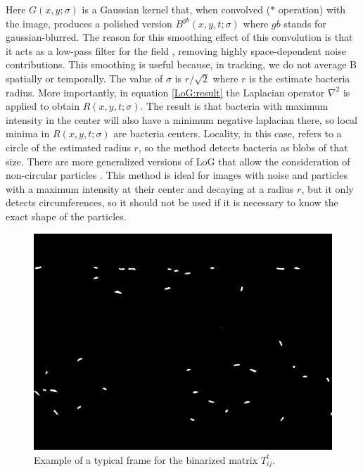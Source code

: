 Here $G(x,y;\sigma)$ is a Gaussian kernel that, when convolved ($*$ operation) with the image, produces a polished version $B^{gb}(x,y,t;\sigma)$ where $gb$ stands for gaussian-blurred. The reason for this smoothing effect of this convolution is that it acts as a low-pass filter for the field \cite{WaltzaAnMachines}, removing highly space-dependent noise contributions. This smoothing is useful because, in tracking, we do not average B spatially or temporally. The value of $\sigma$ is $r/\sqrt{2}$ where $r$ is the estimate bacteria radius. More importantly, in equation \ref{LoG:result} the Laplacian operator $\nabla^2$ is applied to obtain $R(x,y,t;\sigma)$. The result is that bacteria with maximum intensity in the center will also have a minimum negative laplacian there, so local minima in $R(x,y,t;\sigma)$ are bacteria centers. Locality, in this case, refers to a circle of the estimated radius $r$, so the method detects bacteria as blobs of that size. There are more generalized versions of LoG that allow the consideration of non-circular particles \cite{Kong2013AApplications}. This method is ideal for images with noise and particles with a maximum intensity at their center and decaying at a radius $r$, but it only detects circumferences, so it should not be used if it is necessary to know the exact shape of the particles.

\begin{figure}
\centering
\includegraphics[width=\linewidth,angle=0]{imagenes/track_video_frame.PNG}
\caption[Tracking video frame]{Example of a typical frame for the binarized matrix $T_{ij}^t$.}
\label{tracking_video_frame}
\end{figure}


